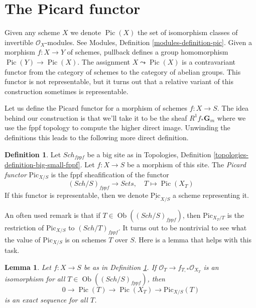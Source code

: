 \documentclass{stacks-project}
\theoremstyle{plain}
\newtheorem{lemma}[subsection]{Lemma}
\theoremstyle{definition}
\newtheorem{definition}[subsection]{Definition}
\theoremstyle{remark}
\numberwithin{equation}{subsection}
\def\Sch{\mathit{Sch}}
\def\Ob{\mathop{\mathrm{Ob}}\nolimits}
\def\Pic{\mathop{\mathrm{Pic}}\nolimits}
\def\Picardfunctor{\mathrm{Pic}}
\begin{document}
\section{The Picard functor}
\label{section-picard-functor}

\noindent
Given any scheme $X$ we denote $\Pic(X)$ the set of isomorphism
classes of invertible $\mathcal{O}_X$-modules.
See Modules, Definition \ref{modules-definition-pic}.
Given a morphism $f : X \to Y$ of schemes, pullback defines
a group homomorphism $\Pic(Y) \to \Pic(X)$.
The assignment
$X \leadsto \Pic(X)$ is a contravariant functor from the category
of schemes to the category of abelian groups. This functor is not
representable, but it turns out that a relative variant of this
construction sometimes is representable.

\medskip\noindent
Let us define the Picard functor for a morphism of schemes $f : X \to S$.
The idea behind our construction is that we'll take it to be the sheaf
$R^1f_*\mathbf{G}_m$ where we use the fppf topology to compute the higher
direct image. Unwinding the definitions this leads to the following more
direct definition.

\begin{definition}
\label{definition-picard-functor}
Let $\Sch_{fppf}$ be a big site as in
Topologies, Definition \ref{topologies-definition-big-small-fppf}.
Let $f : X \to S$ be a morphism of this site. The {\it Picard functor}
$\Picardfunctor_{X/S}$ is the fppf sheafification of the functor
$$
(\Sch/S)_{fppf} \longrightarrow \textit{Sets},\quad
T \longmapsto \Pic(X_T)
$$
If this functor is representable, then we denote
$\underline{\Picardfunctor}_{X/S}$ a scheme representing it.
\end{definition}

\noindent
An often used remark is that if $T \in \Ob((\Sch/S)_{fppf})$, then
$\Picardfunctor_{X_T/T}$ is the restriction of $\Picardfunctor_{X/S}$ to
$(\Sch/T)_{fppf}$.
It turns out to be nontrivial to see what the value of $\Picardfunctor_{X/S}$
is on schemes $T$ over $S$. Here is a lemma that helps with this
task.

\begin{lemma}
\label{lemma-flat-geometrically-connected-fibres}
Let $f : X \to S$ be as in Definition \ref{definition-picard-functor}.
If $\mathcal{O}_T \to f_{T, *}\mathcal{O}_{X_T}$ is an isomorphism
for all $T \in \Ob((\Sch/S)_{fppf})$, then
$$
0 \to \Pic(T) \to \Pic(X_T) \to \Picardfunctor_{X/S}(T)
$$
is an exact sequence for all $T$.
\end{lemma}
\end{document}
